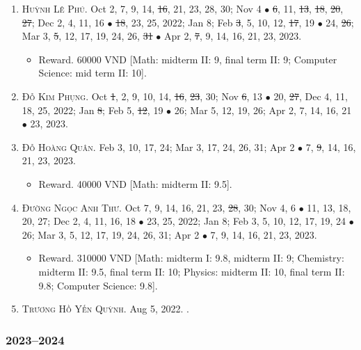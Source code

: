 \documentclass{article}
\begin{document}
\begin{enumerate}
\begin{itemize}
	\end{itemize}
	\item \textsc{Huỳnh Lê Phú.} {\sf[In]} Oct 2, 7, 9, 14, \st{16}, 21, 23, 28, 30; Nov 4 $\bullet$ \st{6}, 11, \st{13}, \st{18}, \st{20}, \st{27}; Dec 2, 4, 11, 16 $\bullet$ \st{18}, 23, 25, 2022; Jan 8; Feb \st{3}, 5, 10, 12, \st{17}, 19 $\bullet$ 24, \st{26}; Mar 3, \st{5}, 12, 17, 19, 24, 26, \st{31} $\bullet$ Apr 2, \st{7}, 9, 14, 16, 21, 23, 2023.
	\begin{itemize}
		\item {\sf Reward.} 60000 VND [Math: midterm II: 9, final term II: 9; Computer Science: mid term II: 10].
	\end{itemize}
	\item \textsc{Đỗ Kim Phụng.} {\sf[In]} Oct \st{1}, 2, 9, 10, 14, \st{16}, \st{23}, 30; Nov \st{6}, 13 $\bullet$ 20, \st{27}, Dec 4, 11, 18, 25, 2022; Jan \st{8}; Feb 5, \st{12}, 19 $\bullet$ 26; Mar 5, 12, 19, 26; Apr 2, 7, 14, 16, 21 $\bullet$ 23, 2023.
	\item \textsc{Đỗ Hoàng Quân.} {\sf[In]} Feb 3, 10, 17, 24; Mar 3, 17, 24, 26, 31; Apr 2 $\bullet$ 7, \st{9}, 14, 16, 21, 23, 2023.
	\begin{itemize}
		\item {\sf Reward.} 40000 VND [Math: midterm II: 9.5].
	\end{itemize}
	\item \textsc{Đường Ngọc Anh Thư.} {\sf[In]} Oct 7, 9, 14, 16, 21, 23, \st{28}, 30; Nov 4, 6 $\bullet$ 11, 13, 18, 20, 27; Dec 2, 4, 11, 16, 18 $\bullet$ 23, 25, 2022; Jan 8; Feb 3, 5, 10, 12, 17, 19, 24 $\bullet$ 26; Mar 3, 5, 12, 17, 19, 24, 26, 31; Apr 2 $\bullet$ 7, 9, 14, 16, 21, 23, 2023.
	\begin{itemize}
		\item {\sf Reward.} 310000 VND [Math: midterm I: 9.8, midterm II: 9; Chemistry: midterm II: 9.5, final term II: 10; Physics: midterm II: 10, final term II: 9.8; Computer Science: 9.8].
	\end{itemize}
	\item \textsc{Trương Hồ Yến Quỳnh.} {\sf[In]} Aug 5, 2022. {\sf[Out]}.
\end{enumerate}

\subsubsection{2023--2024}
\end{document}
